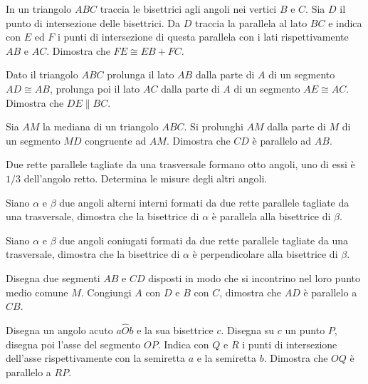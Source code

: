 \begin{multicols}{2}
\begin{esercizio}
\label{ese:3.36}
In un triangolo $ABC$ traccia le bisettrici agli angoli nei vertici 
$B$ e $C$. Sia $D$ il punto di intersezione delle bisettrici. Da $D$ 
traccia la parallela al lato $BC$ e indica con $E$ ed $F$ i punti di 
intersezione di questa parallela con i lati rispettivamente $AB$ e 
$AC$. Dimostra che $FE\cong EB+FC$.
\end{esercizio}

\begin{esercizio}
\label{ese:3.37}
Dato il triangolo $ABC$ prolunga il lato $AB$ dalla parte di $A$ di 
un segmento $AD\cong AB$, prolunga poi il lato $AC$ dalla parte di $A$ 
di un segmento $AE\cong AC$. Dimostra che $DE\parallel BC$.
\end{esercizio}

\begin{esercizio}
\label{ese:3.38}
Sia $AM$ la mediana di un triangolo $ABC$. Si prolunghi $AM$ dalla 
parte di $M$ di un segmento $MD$ congruente ad $AM$. Dimostra che 
$CD$ è parallelo ad $AB$.
\end{esercizio}

\begin{esercizio}
\label{ese:3.39}
Due rette parallele tagliate da una trasversale formano otto angoli, 
uno di essi è $1/3$ dell'angolo retto. Determina le misure degli 
altri angoli.
\end{esercizio}

\begin{esercizio}
\label{ese:3.40}
Siano $\alpha$ e $\beta$ due angoli alterni interni formati da due 
rette parallele tagliate da una trasversale, dimostra che la 
bisettrice di $\alpha$ è parallela alla bisettrice di $\beta$.
\end{esercizio}

\begin{esercizio}
\label{ese:3.41}
Siano $\alpha$ e $\beta$ due angoli coniugati formati da due rette 
parallele tagliate da una trasversale, dimostra che la bisettrice di 
$\alpha$ è perpendicolare alla bisettrice di $\beta$.
\end{esercizio}

\begin{esercizio}
\label{ese:3.42}
Disegna due segmenti $AB$ e $CD$ disposti in modo che si incontrino 
nel loro punto medio comune $M$. Congiungi $A$ con $D$ e $B$ con $C$, 
dimostra che $AD$ è parallelo a $CB$.
\end{esercizio}

\begin{esercizio}
\label{ese:3.43}
Disegna un angolo acuto $a\widehat{O}b$ e la sua bisettrice $c$. 
Disegna su $c$ un punto $P$, disegna poi l'asse del segmento $OP$. 
Indica con $Q$ e $R$ i punti di intersezione dell'asse 
rispettivamente con la semiretta $a$ e la semiretta $b$. Dimostra che 
$OQ$ è parallelo a $RP$.
\end{esercizio}


\end{multicols}
